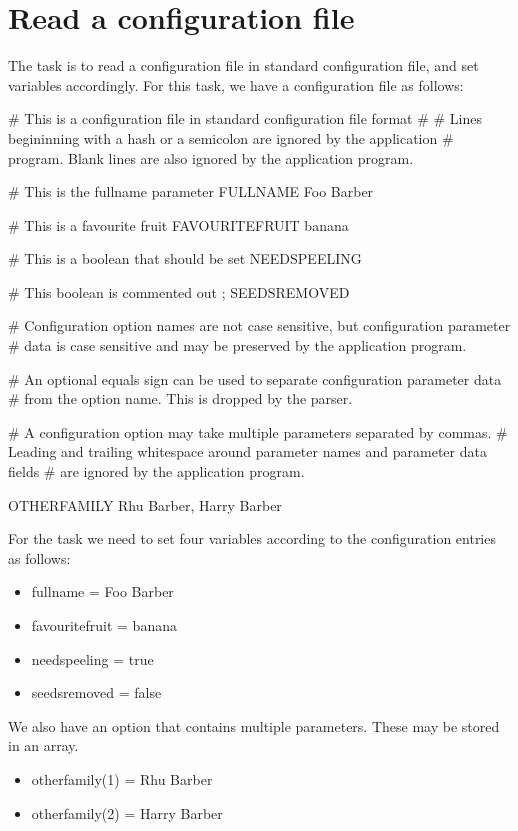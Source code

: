 \pagebreak{}
\section*{Read a configuration file}

The task is to read a configuration file in standard configuration file,
and set variables accordingly. For this task, we have a configuration
file as follows:

\begin{wideverbatim}
# This is a configuration file in standard configuration file format
#
# Lines begininning with a hash or a semicolon are ignored by the application
# program. Blank lines are also ignored by the application program.

# This is the fullname parameter
FULLNAME Foo Barber

# This is a favourite fruit
FAVOURITEFRUIT banana

# This is a boolean that should be set
NEEDSPEELING

# This boolean is commented out
; SEEDSREMOVED

# Configuration option names are not case sensitive, but configuration parameter
# data is case sensitive and may be preserved by the application program.

# An optional equals sign can be used to separate configuration parameter data
# from the option name. This is dropped by the parser. 

# A configuration option may take multiple parameters separated by commas.
# Leading and trailing whitespace around parameter names and parameter data fields
# are ignored by the application program.

OTHERFAMILY Rhu Barber, Harry Barber
\end{wideverbatim}

For the task we need to set four variables according to the
configuration entries as follows:

\begin{itemize}
\item
  fullname = Foo Barber
\item
  favouritefruit = banana
\item
  needspeeling = true
\item
  seedsremoved = false
\end{itemize}

We also have an option that contains multiple parameters. These may be
stored in an array.

\begin{itemize}
\item
  otherfamily(1) = Rhu Barber
\item
  otherfamily(2) = Harry Barber
\end{itemize}


